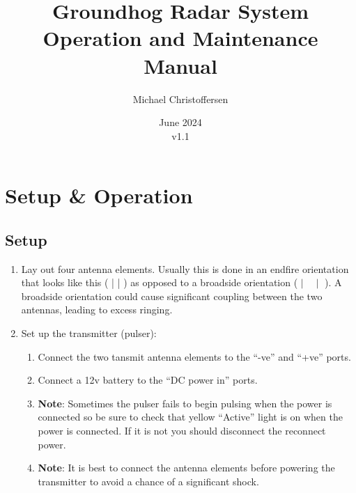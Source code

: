 \documentclass[titlepage]{article}
\title{\Huge Groundhog Radar System Operation and Maintenance Manual}
\author{\LARGE Michael Christoffersen}
\date{\LARGE June 2024\\v1.1}
\begin{document}
\maketitle

\tableofcontents

\pagebreak

\section{Setup \& Operation}
\subsection{Setup}
\begin{enumerate}
    \item Lay out four antenna elements. Usually this is done in an endfire orientation that looks like this ( | | ) as opposed to a broadside orientation ( $\mid \hspace{1em} \mid$ ). A broadside orientation could cause significant coupling between the two antennas, leading to excess ringing.
    \item Set up the transmitter (pulser):
    \begin{enumerate}
        \item Connect the two tansmit antenna elements to the ``-ve'' and ``+ve'' ports.
        \item Connect a 12v battery to the ``DC power in'' ports.
        \item \textbf{Note}: Sometimes the pulser fails to begin pulsing when the power is connected so be sure to check that yellow ``Active'' light is on when the power is connected. If it is not you should disconnect the reconnect power.
        \item \textbf{Note}: It is best to connect the antenna elements before powering the transmitter to avoid a chance of a significant shock.
    \end{enumerate}
    

\end{enumerate}
\end{document}
